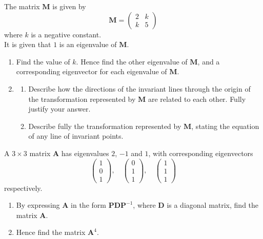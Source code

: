 \documentclass[leqno]{article}
\begin{document}
\begin{enumerate}[
  label=\textbf{\arabic*.},
  leftmargin=*,
  topsep=0pt,
  partopsep=0pt,
  parsep=0pt
]
\questionitem

The matrix $\mathbf{M}$ is given by
\[\mathbf{M} = \begin{pmatrix} 2 & k \\ k & 5 \end{pmatrix}\]
where $k$ is a negative constant. \\

It is given that $1$ is an eigenvalue of $\mathbf{M}$. \\

\begin{enumerate}[label=\textbf{(\alph*)}]
  \item Find the value of $k$. Hence find the other eigenvalue of $\mathbf{M}$, and a corresponding eigenvector for each eigenvalue of $\mathbf{M}$.  \\
  \item
  \begin{enumerate}[label=(\roman*)]
    \item Describe how the directions of the invariant lines through the origin of the transformation represented by $\mathbf{M}$ are related to each other. Fully justify your answer. 
    \item Describe fully the transformation represented by $\mathbf{M}$, stating the equation of any line of invariant points.  \\
  \end{enumerate}
\end{enumerate}

\newpage

\questionitem

A $3 \times 3$ matrix $\mathbf{A}$ has eigenvalues $2$, $-1$ and $1$, with corresponding eigenvectors
\[\begin{pmatrix} 1 \\ 0 \\ 1 \end{pmatrix}, \quad \begin{pmatrix} 0 \\ 1 \\ 1 \end{pmatrix}, \quad \begin{pmatrix} 1 \\ 1 \\ 1 \end{pmatrix}\]
respectively. \\
\begin{enumerate}[label=\textbf{(\alph*)}]
  \item By expressing $\mathbf{A}$ in the form $\mathbf{P}\mathbf{D}\mathbf{P}^{-1}$, where $\mathbf{D}$ is a diagonal matrix, find the matrix $\mathbf{A}$.  \\
  \item Hence find the matrix $\mathbf{A}^4$.  \\
\end{enumerate}


\end{enumerate}
\end{document}
